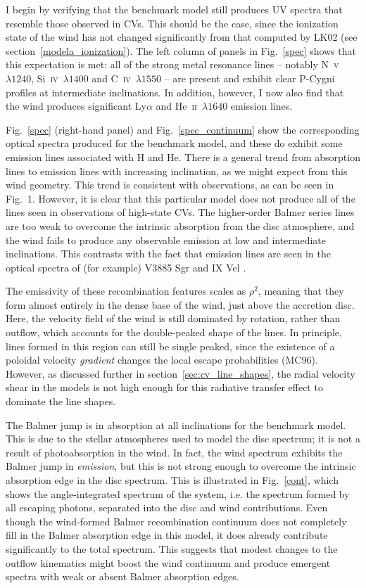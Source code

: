 I begin by verifying that the benchmark model still produces UV
spectra that resemble those observed in CVs. This should be
the case, since the ionization state of the wind has not changed
significantly from that computed by LK02 (see section~\ref{modela_ionization}). 
The left column of panels in Fig.~\ref{spec} shows that this expectation
is met: all of the strong metal resonance
lines -- notably N~\textsc{v}~$\lambda1240$,
Si~\textsc{iv}~$\lambda1400$ and C~\textsc{iv}~$\lambda1550$ -- 
are present and exhibit clear P-Cygni profiles
at intermediate inclinations. In addition, however, I now also find
that the wind produces significant Ly$\alpha$ and
He~\textsc{ii}~$\lambda1640$ emission lines. 

Fig.~\ref{spec} (right-hand panel) and Fig.~\ref{spec_continuum}
show the corresponding optical spectra produced for
the benchmark model, and these do exhibit some emission lines
associated with H and He. There is 
a general trend from absorption lines to emission lines 
with increasing inclination, as we might expect from this wind
geometry. This trend is consistent with observations, as can be seen
in Fig.~1. However, it is clear that this particular model
does not produce all of the lines seen in observations of high-state CVs.
The higher-order Balmer series lines are too weak
to overcome the intrinsic absorption from the disc atmosphere, and the wind 
fails to produce any observable emission at low and intermediate inclinations.
This contrasts with the fact that emission lines are seen 
in the optical spectra of (for example) V3885 Sgr \citep{hartley2005}
and IX Vel \citep[][see also Fig.~1]{beuermann1990}.

The emissivity of these recombination 
features scales as $\rho^2$, meaning that they form almost entirely in the 
dense base of the wind, just above the accretion disc. Here, the
velocity field of the wind is still dominated by rotation, rather than
outflow, which accounts for the double-peaked shape of the lines. In
principle, lines formed in this region can still be single peaked,
since the existence of a poloidal velocity {\em gradient} changes the
local escape probabilities (MC96). However, as
discussed further in section~\ref{sec:cv_line_shapes}, the 
radial velocity shear in the
models is not high enough for this radiative transfer effect
to dominate the line shapes.

The Balmer jump is in absorption at all inclinations for the benchmark
model. This is due to the stellar atmospheres used to
model the disc spectrum; it is not a result of photoabsorption in the
wind. In fact, the wind spectrum exhibits the Balmer jump in {\em
emission}, but this is not strong enough to overcome the intrinsic
absorption edge in the disc spectrum. This is illustrated in
Fig.~\ref{cont}, which shows the angle-integrated spectrum of the system,
i.e. the spectrum formed by all escaping photons, separated into the
disc and wind contributions. Even though the wind-formed Balmer
recombination continuum does not completely fill in the Balmer
absorption edge in this model, it does already contribute
significantly to the total spectrum. This suggests that modest changes 
to the outflow kinematics might boost the wind continuum and produce
emergent spectra with weak or absent Balmer absorption edges. 

